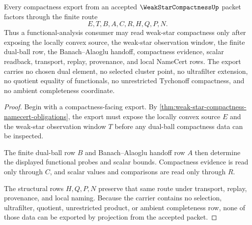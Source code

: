 \begin{theorem}
\label{thm:weak-star-compactness-finite-dual-ball-route}
Every compactness export from an accepted $\WeakStarCompactnessUp$ packet factors through the finite route
$$
E,T,B,A,C,R,H,Q,P,N .
$$
Thus a functional-analysis consumer may read weak-star compactness only after exposing the locally convex source, the weak-star observation window, the finite dual-ball row, the Banach--Alaoglu handoff, compactness evidence, scalar readback, transport, replay, provenance, and local NameCert rows. The export carries no chosen dual element, no selected cluster point, no ultrafilter extension, no quotient equality of functionals, no unrestricted Tychonoff compactness, and no ambient completeness coordinate.
\end{theorem}
\begin{proof}
Begin with a compactness-facing export. By \autoref{thm:weak-star-compactness-namecert-obligations}, the export must expose the locally convex source $E$ and the weak-star observation window $T$ before any dual-ball compactness data can be inspected.

The finite dual-ball row $B$ and Banach--Alaoglu handoff row $A$ then determine the displayed functional probes and scalar bounds. Compactness evidence is read only through $C$, and scalar values and comparisons are read only through $R$.

The structural rows $H,Q,P,N$ preserve that same route under transport, replay, provenance, and local naming. Because the carrier contains no selection, ultrafilter, quotient, unrestricted product, or ambient completeness row, none of those data can be exported by projection from the accepted packet.
\end{proof}



